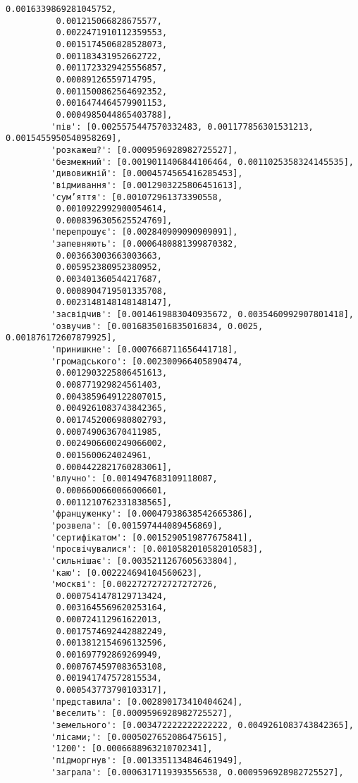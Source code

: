 \documentclass[11pt]{article}
\begin{document}
\begin{Verbatim}[commandchars=\\\{\}]
          0.0016339869281045752,
          0.001215066828675577,
          0.0022471910112359553,
          0.0015174506828528073,
          0.001183431952662722,
          0.0011723329425556857,
          0.00089126559714795,
          0.0011500862564692352,
          0.0016474464579901153,
          0.0004985044865403788],
         'пів': [0.0025575447570332483, 0.001177856301531213, 0.0015455950540958269],
         'розкажеш?': [0.0009596928982725527],
         'безмежний': [0.0019011406844106464, 0.0011025358324145535],
         'дивовижній': [0.0004574565416285453],
         'відмивання': [0.0012903225806451613],
         'сум’яття': [0.001072961373390558,
          0.0010922992900054614,
          0.0008396305625524769],
         'перепрошує': [0.002840909090909091],
         'запевняють': [0.0006480881399870382,
          0.003663003663003663,
          0.005952380952380952,
          0.003401360544217687,
          0.0008904719501335708,
          0.0023148148148148147],
         'засвідчив': [0.0014619883040935672, 0.0035460992907801418],
         'озвучив': [0.0016835016835016834, 0.0025, 0.001876172607879925],
         'принишкне': [0.0007668711656441718],
         'громадського': [0.002300966405890474,
          0.0012903225806451613,
          0.008771929824561403,
          0.0043859649122807015,
          0.0049261083743842365,
          0.0017452006980802793,
          0.000749063670411985,
          0.0024906600249066002,
          0.0015600624024961,
          0.0004422821760283061],
         'влучно': [0.0014947683109118087,
          0.0006600660066006601,
          0.0011210762331838565],
         'француженку': [0.00047938638542665386],
         'розвела': [0.001597444089456869],
         'сертифікатом': [0.0015290519877675841],
         'просвічувалися': [0.0010582010582010583],
         'сильнішає': [0.0035211267605633804],
         'каю': [0.002224694104560623],
         'москві': [0.0022727272727272726,
          0.0007541478129713424,
          0.0031645569620253164,
          0.000724112961622013,
          0.0017574692442882249,
          0.0013812154696132596,
          0.001697792869269949,
          0.0007674597083653108,
          0.001941747572815534,
          0.000543773790103317],
         'представила': [0.002890173410404624],
         'веселить': [0.0009596928982725527],
         'земельного': [0.003472222222222222, 0.0049261083743842365],
         'лісами;': [0.0005027652086475615],
         '1200': [0.0006688963210702341],
         'підморгнув': [0.0013351134846461949],
         'заграла': [0.0006317119393556538, 0.0009596928982725527],

\end{Verbatim}
\end{document}
